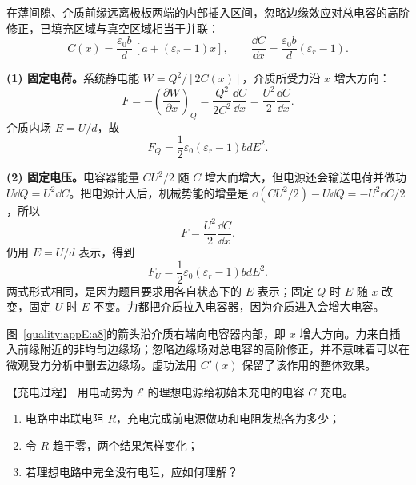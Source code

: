 \begin{xesolution}
在薄间隙、介质前缘远离极板两端的内部插入区间，忽略边缘效应对总电容的高阶修正，已填充区域与真空区域相当于并联：
\begin{equation}
  C(x)=\frac{\varepsilon_0b}{d}\,[a+(\varepsilon_r-1)x],
  \qquad
  \frac{\dd C}{\dd x}=\frac{\varepsilon_0b}{d}(\varepsilon_r-1).
\end{equation}

\textbf{(1) 固定电荷。}系统静电能 $W=Q^2/[2C(x)]$，介质所受力沿 $x$ 增大方向：
\[
  F=-\left(\frac{\partial W}{\partial x}\right)_Q
  =\frac{Q^2}{2C^2}\frac{\dd C}{\dd x}
  =\frac{U^2}{2}\frac{\dd C}{\dd x}.
\]
介质内场 $E=U/d$，故
\begin{equation}
  \boxed{F_Q=\frac12\varepsilon_0(\varepsilon_r-1)bdE^2}.
\end{equation}

\textbf{(2) 固定电压。}电容器能量 $CU^2/2$ 随 $C$ 增大而增大，但电源还会输送电荷并做功
$U\dd Q=U^2\dd C$。把电源计入后，机械势能的增量是
$\dd(CU^2/2)-U\dd Q=-U^2\dd C/2$，所以
\[
  F=\frac{U^2}{2}\frac{\dd C}{\dd x}.
\]
仍用 $E=U/d$ 表示，得到
\begin{equation}
  \boxed{F_U=\frac12\varepsilon_0(\varepsilon_r-1)bdE^2}.
\end{equation}
两式形式相同，是因为题目要求用各自状态下的 $E$ 表示；固定 $Q$ 时 $E$ 随 $x$ 改变，固定
$U$ 时 $E$ 不变。力都把介质拉入电容器，因为介质进入会增大电容。


图~\ref{quality:appE:a8}的箭头沿介质右端向电容器内部，即 $x$ 增大方向。力来自插入前缘附近的非均匀边缘场；忽略边缘场对总电容的高阶修正，并不意味着可以在微观受力分析中删去边缘场。虚功法用 $C'(x)$ 保留了该作用的整体效果。
\end{xesolution}

\begin{origexamplebox}{【充电过程】}\label{appE:ex:s21-32-8}
用电动势为 $\mathcal E$ 的理想电源给初始未充电的电容 $C$ 充电。
\begin{enumerate}[label=(\arabic*),leftmargin=2.2em]
  \item 电路中串联电阻 $R$，充电完成前电源做功和电阻发热各为多少；
  \item 令 $R$ 趋于零，两个结果怎样变化；
  \item 若理想电路中完全没有电阻，应如何理解？
\end{enumerate}

\end{origexamplebox}

